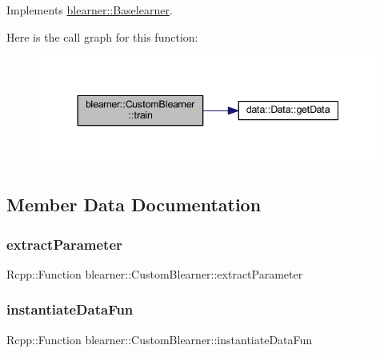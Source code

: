 Implements \mbox{\hyperlink{classblearner_1_1_baselearner_a40e03ad070b9a03aae706d9ee8094b80}{blearner\+::\+Baselearner}}.

Here is the call graph for this function\+:
\nopagebreak
\begin{figure}[H]
\begin{center}
\leavevmode
\includegraphics[width=344pt]{classblearner_1_1_custom_blearner_a4726c5b861b67817f7b3eb61d8f6c0d7_cgraph}
\end{center}
\end{figure}


\subsection{Member Data Documentation}
\mbox{\label{classblearner_1_1_custom_blearner_a95a77720324a16190f84612ea0c0e812}} 
\subsubsection{\texorpdfstring{extract\+Parameter}{extractParameter}}
{\footnotesize\ttfamily Rcpp\+::\+Function blearner\+::\+Custom\+Blearner\+::extract\+Parameter\hspace{0.3cm}{\ttfamily [private]}}

\mbox{\label{classblearner_1_1_custom_blearner_a97bbb549bc85799ec40d3a67cb204222}} 
\subsubsection{\texorpdfstring{instantiate\+Data\+Fun}{instantiateDataFun}}
{\footnotesize\ttfamily Rcpp\+::\+Function blearner\+::\+Custom\+Blearner\+::instantiate\+Data\+Fun\hspace{0.3cm}{\ttfamily [private]}}

